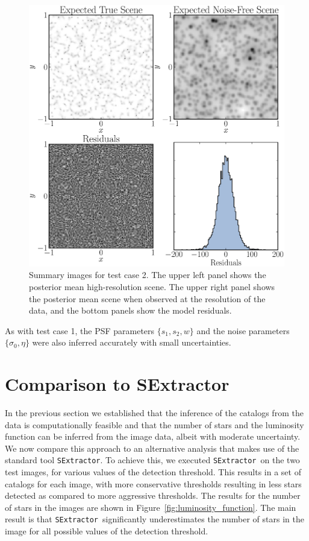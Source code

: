 \documentclass[12pt, preprint]{aastex}
\newcommand{\sex}{{\tt SExtractor}}
\begin{document}
\begin{figure}[ht!]
\begin{center}
\includegraphics[width=\textwidth]{Figures/summaries.eps}
\end{center}
\caption{Summary images for test case 2. The upper left panel shows the posterior
mean high-resolution scene. The upper right panel shows the posterior mean scene
when observed at the resolution of the data, and the bottom panels show the
model residuals.
\label{fig:summaries}}
\end{figure}

As with test case 1, the PSF parameters $\{s_1, s_2, w\}$ and the noise parameters $\{\sigma_0, \eta\}$
were also inferred accurately with small uncertainties.

\section{Comparison to SExtractor}\label{sec:sex}
In the previous section we established that the inference of the catalogs from
the data is computationally feasible and that the number of stars and the
luminosity function can be inferred from the image data, albeit with moderate
uncertainty. We now compare this approach to an alternative analysis that makes
use of the standard
tool \sex. To achieve this, we executed \sex~on the two test images, for various
values of the detection threshold. This results in a set of catalogs
for each image, with more conservative thresholds resulting in less stars detected
as compared to more aggressive thresholds. The results for the number of stars in
the images are shown in Figure~\ref{fig:luminosity_function}. The main result is that
\sex~significantly underestimates the number of stars in the image for all
possible values of the detection threshold.
\end{document}
